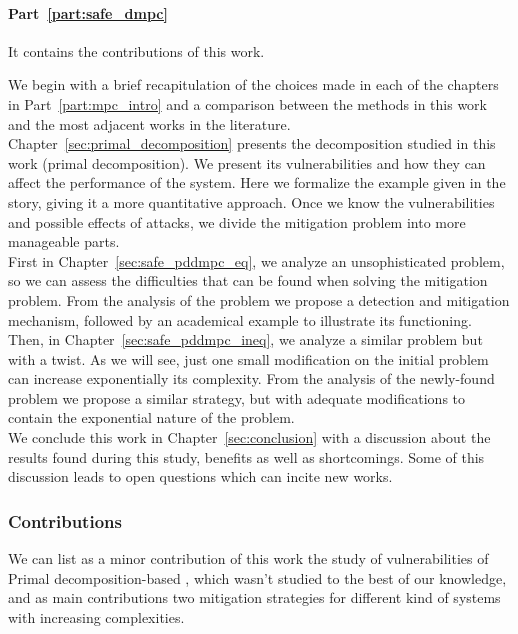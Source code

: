 \documentclass[../main.tex]{subfiles}
\begin{document}
\paragraph{Part~\ref{part:safe_dmpc}} It contains the contributions of this work.

We begin with a brief recapitulation of the choices made in each of the chapters in Part~\ref{part:mpc_intro} and a comparison between the methods in this work and the most adjacent works in the literature.
\\Chapter~\ref{sec:primal_decomposition} presents the decomposition studied in this work (primal decomposition). We present its vulnerabilities and how they can affect the performance of the system. Here we formalize the example given in the story, giving it a more quantitative approach.
Once we know the vulnerabilities and possible effects of attacks, we divide the mitigation problem into more manageable parts.
\\ First in Chapter~\ref{sec:safe_pddmpc_eq}, we analyze an unsophisticated problem, so we can assess the difficulties that can be found when solving the mitigation problem. From the analysis of the problem we propose a detection and mitigation mechanism, followed by an academical example to illustrate its functioning.
\\Then, in Chapter~\ref{sec:safe_pddmpc_ineq}, we analyze a similar problem but with a twist. As we will see, just one small modification on the initial problem can increase exponentially its complexity.
From the analysis of the newly-found problem we propose a similar strategy, but with adequate modifications to contain the exponential nature of the problem.
\\We conclude this work in Chapter~\ref{sec:conclusion} with a discussion about the results found during this study, benefits as well as shortcomings. Some of this discussion leads to open questions which can incite new works.

\subsubsection{Contributions}
We can list as a minor contribution of this work the study of vulnerabilities of Primal decomposition-based \dmpc{}, which wasn't studied to the best of our knowledge,
and as main contributions two mitigation strategies for different kind of systems with increasing complexities.
\end{document}
